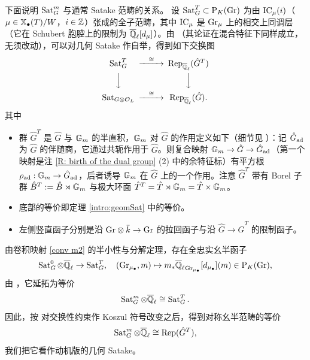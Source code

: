 下面说明 $\operatorname{Sat}_G^m$ 与通常 Satake 范畴的关系。
设 $\operatorname{Sat}^T_G\subset \operatorname{P}_K({\operatorname{Gr}})$ 为由 $\operatorname{IC}_\mu(i)$（$\mu\in\mathbb{X}_\bullet(T)/W$，$i\in{\mathbb Z}$）张成的全子范畴，其中 $\operatorname{IC}_\mu$ 是 ${\operatorname{Gr}}_\mu$ 上的相交上同调层（它在 Schubert 胞腔上的限制为 ${\overline{{\mathbb Q}}_\ell}[d_\mu]$）。由 \cite[引理 5.5.14]{Zh2}（其论证在混合特征下同样成立，无须改动），可以对几何 Satake 作自举，得到如下交换图
\[
\begin{CD}
\Sat^T_G@>\cong>>\on{Rep}_{\Ql}(\hat G^T)\\
@VVV@VVV\\
\Sat_{G\otimes\mO_L}@>\cong>>\on{Rep}_{\Ql}(\hat G).
\end{CD}
\]
其中
\begin{itemize}
\item 群 $\hat{G}^T$ 是 $\hat{G}$ 与 ${\mathbb G}_m$ 的半直积，${\mathbb G}_m$ 对 $\hat G$ 的作用定义如下（细节见 \cite[(5.5.10)]{Zh2}）：记 $\hat G_{\operatorname{ad}}$ 为 $\hat G$ 的伴随商，它通过共轭作用于 $\hat G$。则复合映射 ${\mathbb G}_m\to \hat G\to\hat G_{\operatorname{ad}}$（第一个映射是注 \ref{R: birth of the dual group} (2) 中的余特征标）有平方根 $\rho_{\operatorname{ad}}:{\mathbb G}_m\to \hat G_{\operatorname{ad}}$，后者诱导 ${\mathbb G}_m$ 在 $\hat G$ 上的一个作用。注意 $\hat G^T$ 带有 Borel 子群 $\hat B^T:=\hat B\rtimes{\mathbb G}_m$ 与极大环面 $\hat T^T=\hat T\rtimes {\mathbb G}_m=\hat T\times {\mathbb G}_m$。
\item 底部的等价即定理 \ref{intro:geomSat} 中的等价。
\item 左侧竖直函子分别是沿 ${\operatorname{Gr}}\otimes\bar k \to {\operatorname{Gr}}$ 的拉回函子与沿 $\hat G\to \hat G^T$ 的限制函子。
\end{itemize}

由卷积映射 \eqref{conv m2} 的半小性与分解定理，存在全忠实幺半函子
$$\operatorname{Sat}_G^0\otimes{\overline{{\mathbb Q}}_\ell}\to \operatorname{Sat}_G^T,\quad ({\operatorname{Gr}}_{{\mu_\bullet}},m)\mapsto m_*{\overline{{\mathbb Q}}_\ell}_{{\operatorname{Gr}}_{{\mu_\bullet}}}[d_{{\mu_\bullet}}](m)\in \operatorname{P}_K({\operatorname{Gr}}),$$
由 \cite[引理 2.16]{Zh1}，它延拓为等价
$$\operatorname{Sat}^m_G\otimes{\overline{{\mathbb Q}}_\ell}\cong \operatorname{Sat}^T_G.$$
因此，按 \cite[(2.4.4)]{Zh1} 对交换性约束作 Koszul 符号改变之后，得到对称幺半范畴的等价
\begin{equation*}
\label{E:geom sat Tate}
\operatorname{Sat}^m_G\otimes{\overline{{\mathbb Q}}_\ell}\cong \operatorname{Rep}(\hat{G}^T),
\end{equation*}
我们把它看作动机版的几何 Satake。

